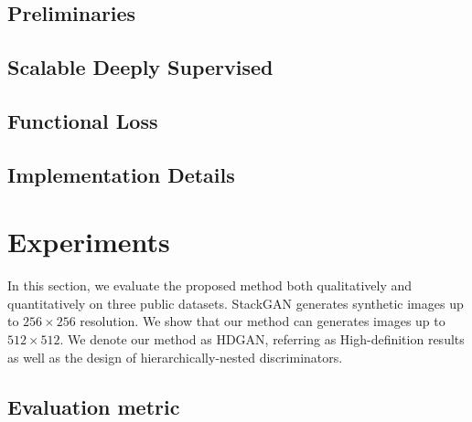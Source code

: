 \documentclass[10pt,twocolumn,letterpaper]{article}
\begin{document}
\subsection{Preliminaries}

\subsection{Scalable Deeply Supervised}

\subsection{Functional Loss}

\subsection{Implementation Details}



\section{Experiments}
In this section, we evaluate the proposed method both qualitatively and quantitatively on three public datasets. StackGAN \cite{han2017stackgan} generates synthetic images up to  $256{\times}256$ resolution. We show that our method can generates images up to  $512{\times}512$. We denote our method as HDGAN, referring as High-definition results as well as the design of hierarchically-nested discriminators.



\subsection{Evaluation metric}
\end{document}
